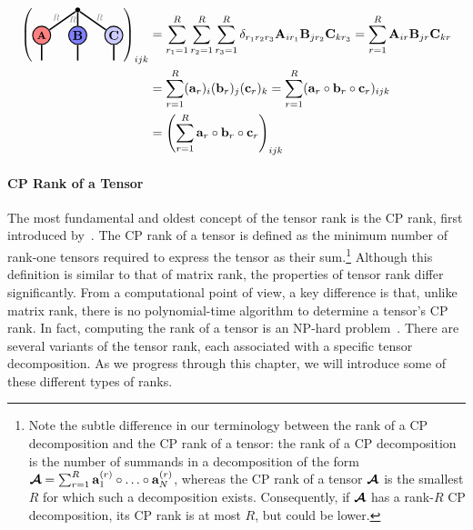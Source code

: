 \begin{align*}
    \left(\begin{tikzpicture}[baseline=\baseline]
    \tikzset{tensor/.style = {minimum size = 0.5cm,shape = circle,thick,draw=black,inner sep = 0pt}, edge/.style   = {thick,line width=.4mm},every loop/.style={}}
    \def\y{0}
    \def\x{0}
  \node[tensor,fill=red!50!white] (A) at (\x,\y){\scalebox{0.85}{$\Ab$}};
  \node[tensor,fill=blue!50!white] (B) at (\x+1,\y){$\Bb$};
   \node[tensor,fill=blue!20!white] (C) at (\x+2,\y){$\Cb$};
    \draw  node[fill = black,circle,inner sep=0pt,minimum size=4pt] (m) at (\x+1,\y+0.7) {};
    \draw[edge] (A) -- (m);
    \node[draw=none] () at (\x+0.4,\y+0.5) {\scalebox{0.7}{\dimcolor{$R$}}};
    \draw[edge] (B) -- (m) node [midway,left=-0.09cm] {\scalebox{0.7}{\dimcolor{$R$}}};
    \draw[edge] (C) -- (m);
    \node[draw=none] () at (\x+1.6,\y+0.5) {\scalebox{0.7}{\dimcolor{$R$}}};
    \draw[edge](A) -- (\x,\y-0.7);
    \draw[edge](B) -- (\x+1,\y-0.7);
    \draw[edge](C) -- (\x+2,\y-0.7);
\end{tikzpicture}\right)_{ijk} 
&= \sum_{r_1=1}^R\sum_{r_2=1}^R\sum_{r_3=1}^R\delta_{r_1r_2r_3}\Ab_{ir_1}\Bb_{jr_2}\Cb_{kr_3}
=
\sum_{r=1}^R\Ab_{ir}\Bb_{jr}\Cb_{kr}\\
&=
\sum_{r=1}^R(\ab_r)_i(\bb_r)_j(\cbb_r)_k 
=
\sum_{r=1}^R(\ab_r\outprod\bb_r\outprod\cbb_r)_{ijk}\\
&=
\left(\sum_{r=1}^R\ab_r\outprod\bb_r\outprod\cbb_r\right)_{ijk}
\end{align*}
\paragraph{CP Rank of a Tensor} 
The most fundamental and oldest concept of the tensor rank is the CP rank, first introduced by~\citep{hitchcock1927expression}. The CP rank of a tensor is defined as the minimum number of rank-one tensors required to express the tensor as their sum.\footnote{Note the subtle difference in our terminology between the rank of a CP decomposition and the CP rank of a tensor:  the rank of a CP decomposition is the number of summands in a decomposition of the form $\At = \sum_{r=1}^R \ab^{(r)}_1\outprod\dots\outprod\ab^{(r)}_N$, whereas the CP rank of a tensor $\bm{\mathcal{A}}$ is the smallest $R$ for which such a decomposition exists. Consequently, if $\bm{\mathcal{A}}$ has a rank-$R$ CP decomposition, its CP rank is at most $R$, but could be lower.}
Although this definition is similar to that of matrix rank, the properties of tensor rank differ significantly. From a computational point of view, a key difference is that, unlike matrix rank, there is no polynomial-time algorithm to determine a tensor’s CP rank. In fact, computing the rank of a tensor is an NP-hard problem~\citep{hillar2013most}.
There are several variants of the tensor rank, each associated with a specific tensor decomposition. As we progress through this chapter, we will introduce some of these different types of ranks.


